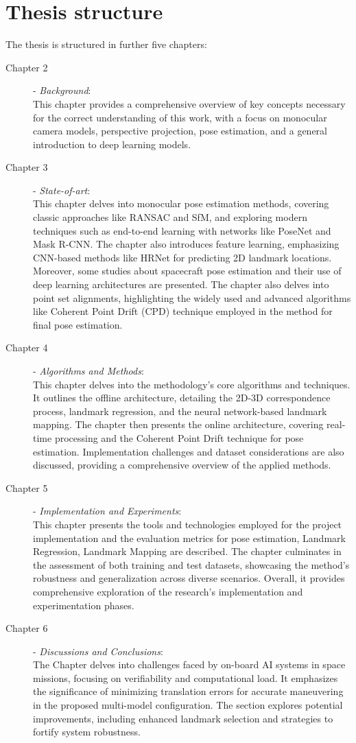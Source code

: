 \section{Thesis structure}
The thesis is structured in further five chapters:
\begin{description}
    \item[Chapter 2] - \textit{Background}:\\ This chapter provides a comprehensive overview of key concepts necessary for the correct understanding of this work, with a focus on monocular camera models, perspective projection, pose estimation, and a general introduction to deep learning models.
    \item[Chapter 3] - \textit{State-of-art}:\\ This chapter delves into monocular pose estimation methods, covering classic approaches like RANSAC and SfM, and exploring modern techniques such as end-to-end learning with networks like PoseNet and Mask R-CNN. The chapter also introduces feature learning, emphasizing CNN-based methods like HRNet for predicting 2D landmark locations. Moreover, some studies about spacecraft pose estimation and their use of deep learning architectures are presented. The chapter also delves into point set alignments, highlighting the widely used and advanced algorithms like Coherent Point Drift (CPD) technique employed in the method for final pose estimation.
    \item[Chapter 4] - \textit{Algorithms and Methods}: \\
    This chapter delves into the methodology's core algorithms and techniques. It outlines the offline architecture, detailing the 2D-3D correspondence process, landmark regression, and the neural network-based landmark mapping. The chapter then presents the online architecture, covering real-time processing and the Coherent Point Drift technique for pose estimation. Implementation challenges and dataset considerations are also discussed, providing a comprehensive overview of the applied methods.
    \item[Chapter 5] - \textit{Implementation and Experiments}:\\
    This chapter presents the tools and technologies employed for the project implementation and the evaluation metrics for pose estimation, Landmark Regression, Landmark Mapping are described. The chapter culminates in the assessment of both training and test datasets, showcasing the method's robustness and generalization across diverse scenarios. Overall, it provides comprehensive exploration of the research's implementation and experimentation phases.
    \item[Chapter 6] - \textit{Discussions and Conclusions}:\\
    The Chapter delves into challenges faced by on-board AI systems in space missions, focusing on verifiability and computational load. It emphasizes the significance of minimizing translation errors for accurate maneuvering in the proposed multi-model configuration. The section explores potential improvements, including enhanced landmark selection and strategies to fortify system robustness.
\end{description}
